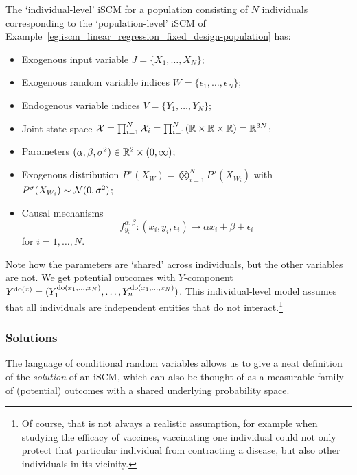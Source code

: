 \begin{Eg}
  The `individual-level' iSCM for a population consisting of $N$ individuals corresponding to the `population-level' iSCM of Example~\ref{eg:iscm_linear_regression_fixed_design-population} has:
  \begin{itemize}
    \item Exogenous input variable $J = \{X_1,\dots,X_N\}$;
    \item Exogenous random variable indices $W = \{\epsilon_1,\dots,\epsilon_N\}$;
    \item Endogenous variable indices $V = \{Y_1,\dots,Y_N\}$;
    \item Joint state space $\mathcal{X} = \prod_{i=1}^N \mathcal{X}_i = \prod_{i=1}^N (\mathbb{R} \times \mathbb{R} \times \mathbb{R}) = \mathbb{R}^{3N}$;
    \item Parameters $(\alpha,\beta,\sigma^2) \in \mathbb{R}^2 \times (0,\infty)$;
    \item Exogenous distribution $P^\sigma(X_W) = \bigotimes_{i=1}^N P^\sigma(X_{W_i})$ with $P^\sigma(X_{W_i}) \sim \mathcal{N}(0,\sigma^2)$;
    \item Causal mechanisms 
      $$f^{\alpha,\beta}_{y_i} : (x_i,y_i,\epsilon_i) \mapsto \alpha x_i + \beta + \epsilon_i$$
      for $i=1,\dots,N$.
  \end{itemize}
  Note how the parameters are `shared' across individuals, but the other variables are not.
  We get potential outcomes with $Y$-component $Y^{\operatorname{do}(x)} = (Y_1^{\operatorname{do}(x_1,\dots,x_N)},\dots,Y_n^{\operatorname{do}(x_1,\dots,x_N)})$.
  This individual-level model assumes that all individuals are independent entities that do not interact.\footnote{Of course, that is not always a realistic assumption, for example when studying the efficacy of vaccines, vaccinating one individual could not only protect that particular individual from contracting a disease, but also other individuals in its vicinity.}
\end{Eg}

\subsubsection{Solutions}

The language of conditional random variables allows us to give a neat definition of the \emph{solution} of an iSCM, which can also be thought of as a measurable family of (potential) outcomes with a shared underlying probability space.

